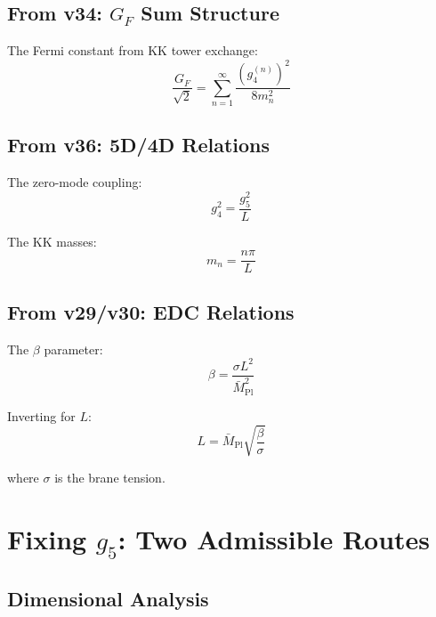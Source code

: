 \documentclass[11pt,a4paper]{article}
\begin{document}
\subsection{From v34: $G_F$ Sum Structure}
\label{subsec:v34-import}

The Fermi constant from KK tower exchange:
\begin{equation}
\label{eq:v34-gf-sum}
\frac{G_F}{\sqrt{2}} = \sum_{n=1}^{\infty} \frac{(g_4^{(n)})^2}{8 m_n^2}
\end{equation}

\subsection{From v36: 5D/4D Relations}
\label{subsec:v36-import}

The zero-mode coupling:
\begin{equation}
\label{eq:v36-g4}
g_4^2 = \frac{g_5^2}{L}
\end{equation}

The KK masses:
\begin{equation}
\label{eq:v36-mn}
m_n = \frac{n\pi}{L}
\end{equation}

\subsection{From v29/v30: EDC Relations}
\label{subsec:v29-v30-import}

The $\beta$ parameter:
\begin{equation}
\label{eq:v29-beta}
\beta = \frac{\sigma L^2}{\bar{M}_{\text{Pl}}^2}
\end{equation}

Inverting for $L$:
\begin{equation}
\label{eq:v30-L}
L = \bar{M}_{\text{Pl}} \sqrt{\frac{\beta}{\sigma}}
\end{equation}

where $\sigma$ is the brane tension.

\section{Fixing $g_5$: Two Admissible Routes}
\label{sec:g5-fixing}

\subsection{Dimensional Analysis}
\label{subsec:g5-dim}
\end{document}

